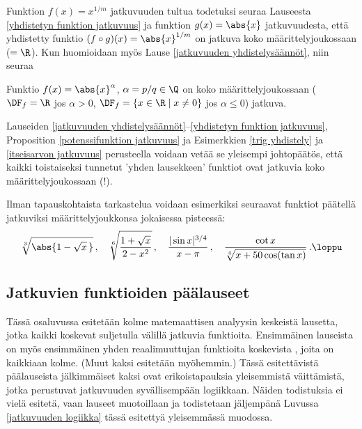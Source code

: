 Funktion $f(x)=x^{1/m}$ jatkuvuuden tultua todetuksi seuraa Lauseesta 
\ref{yhdistetyn funktion jatkuvuus} ja funktion $g(x)=\abs{x}$ jatkuvuudesta, että yhdistetty 
funktio $(f\circ g)(x) = \abs{x}^{1/m}$ on jatkuva koko määrittelyjoukossaan ($= \R$). Kun
huomioidaan myös Lause \ref{jatkuvuuden yhdistelysäännöt}, niin seuraa
\begin{Prop} \label{potenssifunktion jatkuvuus}
Funktio $f(x)=\abs{x}^\alpha$, $\alpha=p/q\in\Q$ on koko määrittelyjoukossaan ($\DF_f=\R$ jos
$\alpha>0$, $\DF_f=\{x\in\R \mid x \neq 0\}$ jos $\alpha \leq 0$) jatkuva.
\end{Prop}
Lauseiden \ref{jatkuvuuden yhdistelysäännöt}--\ref{yhdistetyn funktion jatkuvuus}, Proposition
\ref{potenssifunktion jatkuvuus} ja Esimerkkien \ref{trig yhdistely} ja
\ref{itseisarvon jatkuvuus} perusteella voidaan vetää se yleisempi johtopäätös, että kaikki
toistaiseksi tunnetut 'yhden lausekkeen' funktiot ovat jatkuvia koko määrittelyjoukossaan (!).
\begin{Exa} Ilman tapauskohtaista tarkastelua voidaan esimerkiksi seuraavat funktiot
päätellä jatkuviksi määrittelyjoukkonsa jokaisessa pisteessä:
\[
\sqrt[3]{\abs{1-\sqrt{x}\,}}\,, \quad 
\sqrt[6]{\frac{1+\sqrt{x}}{2-x^2}}\,, \quad
\frac{|\sin x|^{3/4}}{x-\pi}\,, \quad 
\frac{\cot x}{\sqrt[4]{x+50\cos(\tan x)}}\,. \loppu
\]
\end{Exa}

\subsection{Jatkuvien funktioiden päälauseet}

Tässä osaluvussa esitetään kolme matemaattisen analyysin keskeistä lausetta, jotka kaikki
koskevat suljetulla välillä jatkuvia funktioita. Ensimmäinen lauseista on myös ensimmäinen
yhden reaalimuuttujan funktioita koskevista , joita on kaikkiaan kolme.
(Muut kaksi esitetään myöhemmin.) Tässä esitettävistä päälauseista jälkimmäiset kaksi ovat
erikoistapauksia yleisemmistä väittämistä, jotka perustuvat jatkuvuuden syvällisempään
logiikkaan. Näiden todistuksia ei vielä esitetä, vaan lauseet muotoillaan ja todistetaan
jäljempänä Luvussa \ref{jatkuvuuden logiikka} tässä esitettyä yleisemmässä muodossa. 
 
